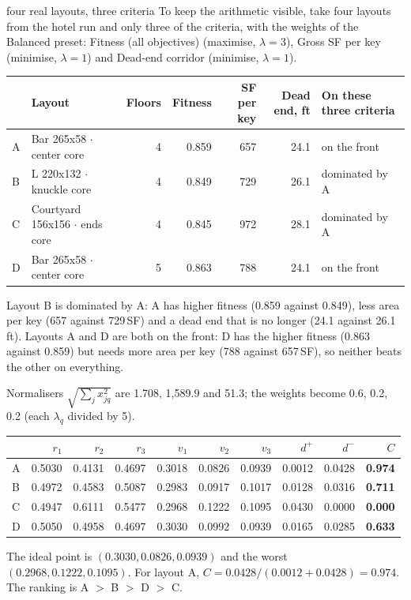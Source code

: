 \documentclass[10pt,a4paper]{article}
\begin{document}
\begin{example}{four real layouts, three criteria}
To keep the arithmetic visible, take four layouts from the hotel run and only three of the criteria, with the weights
of the Balanced preset: Fitness (all objectives) (maximise, $\lambda = 3$), Gross SF per key (minimise, $\lambda = 1$) and Dead-end corridor
(minimise, $\lambda = 1$).
\begin{center}\centering\footnotesize
\begin{tabular}{@{}l l r r r r l@{}}
\toprule
\textbf{} & \textbf{Layout} & \textbf{Floors} & \textbf{Fitness} & \textbf{SF per key} & \textbf{Dead end, ft} & \textbf{On these three criteria} \\ \midrule
A & Bar 265x58 $\cdot$ center core & 4 & 0.859 & 657 & 24.1 & on the front \\
B & L 220x132 $\cdot$ knuckle core & 4 & 0.849 & 729 & 26.1 & dominated by A \\
C & Courtyard 156x156 $\cdot$ ends core & 4 & 0.845 & 972 & 28.1 & dominated by A \\
D & Bar 265x58 $\cdot$ center core & 5 & 0.863 & 788 & 24.1 & on the front \\
\bottomrule
\end{tabular}
\end{center}
Layout B is dominated by A: A has higher fitness (0.859 against 0.849), less area per key (657 against 729\,SF) and a dead end that is no longer (24.1 against 26.1\,ft). Layouts A and D are both on the front: D has the higher fitness (0.863 against 0.859) but needs more area per key (788 against 657\,SF), so neither beats the other on everything.

Normalisers $\sqrt{\sum_j x_{jq}^2}$ are 1.708, 1,589.9 and 51.3; the weights become 0.6, 0.2, 0.2
(each $\lambda_q$ divided by 5).
\begin{center}\centering\small
\begin{tabular}{@{}l r r r r r r r r r@{}}
\toprule
\textbf{} & \textbf{$r_1$} & \textbf{$r_2$} & \textbf{$r_3$} & \textbf{$v_1$} & \textbf{$v_2$} & \textbf{$v_3$} & \textbf{$d^+$} & \textbf{$d^-$} & \textbf{$C$} \\ \midrule
A & 0.5030 & 0.4131 & 0.4697 & 0.3018 & 0.0826 & 0.0939 & 0.0012 & 0.0428 & \textbf{0.974} \\
B & 0.4972 & 0.4583 & 0.5087 & 0.2983 & 0.0917 & 0.1017 & 0.0128 & 0.0316 & \textbf{0.711} \\
C & 0.4947 & 0.6111 & 0.5477 & 0.2968 & 0.1222 & 0.1095 & 0.0430 & 0.0000 & \textbf{0.000} \\
D & 0.5050 & 0.4958 & 0.4697 & 0.3030 & 0.0992 & 0.0939 & 0.0165 & 0.0285 & \textbf{0.633} \\
\bottomrule
\end{tabular}
\end{center}
The ideal point is $(0.3030, 0.0826, 0.0939)$ and the worst $(0.2968, 0.1222, 0.1095)$. For layout A,
$C = 0.0428 / (0.0012 + 0.0428) = 0.974$. The ranking is A $>$ B $>$ D $>$ C.


\end{example}
\end{document}
